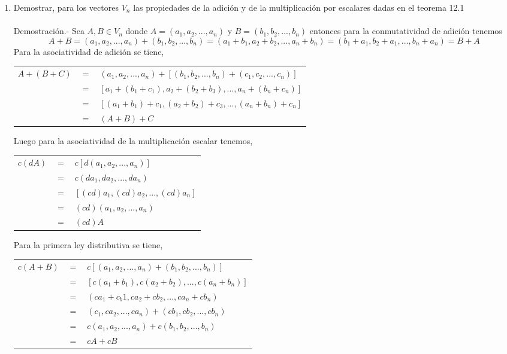 \begin{enumerate}
\begin{enumerate}[\bfseries a)]
    \item Demostrar, para los vectores $V_n$ las propiedades de la adición y de la multiplicación por escalares dadas en el teorema 12.1\\\\
	Demostración.-\; Sea $A,B \in V_n$ donde $A=(a_1,a_2,...,a_n)$ y $B=(b_1,b_2,...,b_n)$ entonces para la conmutatividad de adición tenemos $$A+B=(a_1,a_2,...,a_n)+(b_1,b_2,...,b_n) = (a_1+b_1,a_2+b_2,...,a_n+b_n) = (b_1+a_1,b_2+a_1,...,b_n+a_n) = B+A$$
	Para la asociatividad de adición se tiene,
	\begin{center}
	    \begin{tabular}{rcl}
		$A+(B+C)$&$=$&$(a_1,a_2,...,a_n)+\left[(b_1,b_2,...,b_n)+(c_1,c_2,...,c_n)\right]$\\
		&$=$&$\left[a_1+(b_1+c_1),a_2+(b_2+b_3),...,a_n+(b_n+c_n)\right]$\\
		&$=$&$\left[(a_1+b_1)+c_1,(a_2+b_2)+c_3,...,(a_n+b_n)+c_n\right]$\\
		&$=$&$(A+B)+C$\\
	    \end{tabular}
	\end{center}
	Luego para la asociatividad de la multiplicación escalar tenemos,
	\begin{center}
	    \begin{tabular}{rcl}
		$c(dA)$&$=$&$c\left[d(a_1,a_2,...,a_n)\right]$\\
		&$=$&$c(da_1,da_2,...,da_n)$\\
		&$=$&$\left[(cd)a_1,(cd)a_2,...,(cd)a_n\right]$\\
		&$=$&$(cd)(a_1,a_2,...,a_n)$\\
		&$=$&$(cd)A$\\
	    \end{tabular}
	\end{center}
	Para la primera ley distributiva se tiene,
	\begin{center}
	    \begin{tabular}{rcl}
		$c(A+B)$&$=$&$c\left[(a_1,a_2,...,a_n)+(b_1,b_2,...,b_n)\right]$\\
		&$=$&$\left[c(a_1+b_1),c(a_2+b_2),...,c(a_n+b_n)\right]$\\
		&$=$&$(ca_1+c_b1,ca_2+cb_2,...,ca_n+cb_n)$\\
		&$=$&$(c_1,ca_2,...,ca_n)+(cb_1,cb_2,...,cb_n)$\\
		&$=$&$c(a_1,a_2,...,a_n)+c(b_1,b_2,...,b_n)$\\
		&$=$&$cA+cB$\\

\end{tabular}
\end{center}
\end{enumerate}
\end{enumerate}
